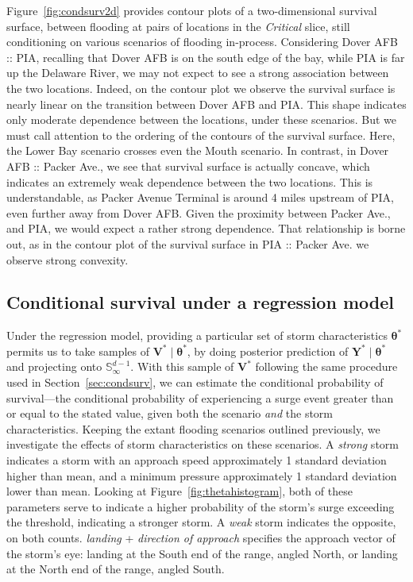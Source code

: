 Figure~\ref{fig:condsurv2d} provides contour plots of a two-dimensional survival surface, 
    between flooding at pairs of locations in the \emph{Critical} slice, still conditioning 
    on various scenarios of flooding in-process.  Considering Dover AFB :: PIA, recalling 
    that Dover AFB is on the south edge of the bay, while PIA is far up the Delaware River, 
    we may not expect to see a strong association between the two locations.  Indeed, on the 
    contour plot we observe the survival surface is nearly linear on the transition between 
    Dover AFB and PIA.   This shape indicates
    only moderate dependence between the locations, under these scenarios.  But we must call 
    attention to the ordering of the contours of the survival surface.  Here, the Lower Bay 
    scenario crosses even the Mouth scenario.  In contrast, in Dover AFB :: Packer Ave., we 
    see that survival surface is actually concave, which indicates an extremely weak 
    dependence between the two locations.  This is understandable, as Packer Avenue Terminal 
    is around 4 miles upstream of PIA, even further away from Dover AFB.  Given the proximity
    between Packer Ave., and PIA, we would expect a rather strong dependence.  That 
    relationship is borne out, as in the contour plot of the survival surface in PIA :: Packer 
    Ave. we observe strong convexity.

\subsection{Conditional survival under a regression model}

Under the regression model, providing a particular set of storm characteristics $\bm{\theta}^*$ 
    permits us to take samples of $\bm{V}^*\mid\bm{\theta}^*$, by doing posterior prediction of
    $\bm{Y}^*\mid\bm{\theta}^*$ and projecting onto $\mathbb{S}_{\infty}^{d-1}$.  With this
    sample of $\bm{V}^*$ following the same procedure used in Section~\ref{sec:condsurv},
    we can estimate the conditional probability of survival---the conditional probability
    of experiencing a surge event greater than or equal to the stated value, given both the
    scenario \emph{and} the storm characteristics.  Keeping the extant flooding scenarios
    outlined previously, we investigate the effects of storm characteristics on these scenarios.
    A \emph{strong} storm indicates a storm with an approach speed approximately 1 standard
    deviation higher than mean, and a minimum pressure approximately 1 standard deviation lower
    than mean. Looking at Figure~\ref{fig:thetahistogram}, both of these parameters serve to
    indicate a higher probability of the storm's surge exceeding the threshold, indicating a 
    stronger storm.  A \emph{weak} storm indicates the opposite, on both counts.  \emph{landing}
    + \emph{direction of approach} specifies the approach vector of the storm's eye: landing at 
    the South end of the range, angled North, or landing at the North end of the range, angled 
    South.

